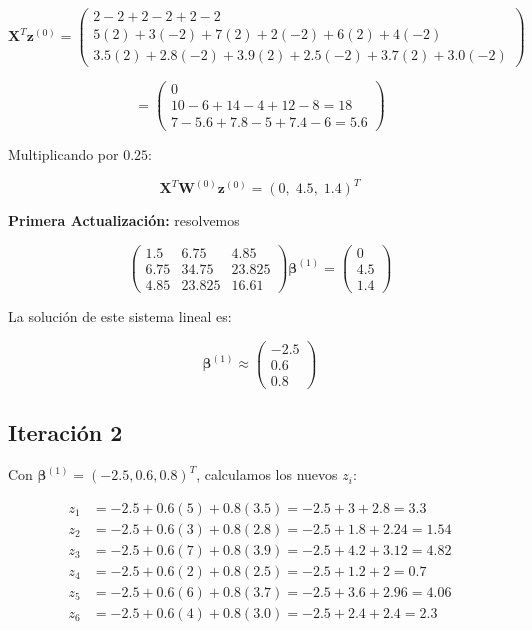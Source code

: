 \documentclass[12pt]{article}
\begin{document}
\[
\mathbf{X}^T \mathbf{z}^{(0)} = 
\begin{pmatrix}
2 - 2 + 2 - 2 + 2 - 2 \\ 
5(2) + 3(-2) + 7(2) + 2(-2) + 6(2) + 4(-2) \\ 
3.5(2) + 2.8(-2) + 3.9(2) + 2.5(-2) + 3.7(2) + 3.0(-2)
\end{pmatrix}
\]

\[
= 
\begin{pmatrix}
0 \\ 10 - 6 + 14 - 4 + 12 - 8 = 18 \\ 7 - 5.6 + 7.8 - 5 + 7.4 - 6 = 5.6
\end{pmatrix}
\]

Multiplicando por $0.25$:

\[
\mathbf{X}^T \mathbf{W}^{(0)} \mathbf{z}^{(0)} = (0, \; 4.5, \; 1.4)^T
\]

\textbf{Primera Actualización:} resolvemos

\[
\begin{pmatrix}
1.5 & 6.75 & 4.85 \\
6.75 & 34.75 & 23.825 \\
4.85 & 23.825 & 16.61
\end{pmatrix}
\boldsymbol{\beta}^{(1)} = 
\begin{pmatrix}
0 \\ 4.5 \\ 1.4
\end{pmatrix}
\]

La solución de este sistema lineal es:

\[
\boldsymbol{\beta}^{(1)} \approx 
\begin{pmatrix}
-2.5 \\ 0.6 \\ 0.8
\end{pmatrix}
\]

\subsection{Iteración 2}

Con $\boldsymbol{\beta}^{(1)} = (-2.5, 0.6, 0.8)^T$, calculamos los nuevos $z_i$:

\[
\begin{aligned}
z_1 &= -2.5 + 0.6(5) + 0.8(3.5) = -2.5 + 3 + 2.8 = 3.3 \\
z_2 &= -2.5 + 0.6(3) + 0.8(2.8) = -2.5 + 1.8 + 2.24 = 1.54 \\
z_3 &= -2.5 + 0.6(7) + 0.8(3.9) = -2.5 + 4.2 + 3.12 = 4.82 \\
z_4 &= -2.5 + 0.6(2) + 0.8(2.5) = -2.5 + 1.2 + 2 = 0.7 \\
z_5 &= -2.5 + 0.6(6) + 0.8(3.7) = -2.5 + 3.6 + 2.96 = 4.06 \\
z_6 &= -2.5 + 0.6(4) + 0.8(3.0) = -2.5 + 2.4 + 2.4 = 2.3
\end{aligned}
\]
\end{document}
